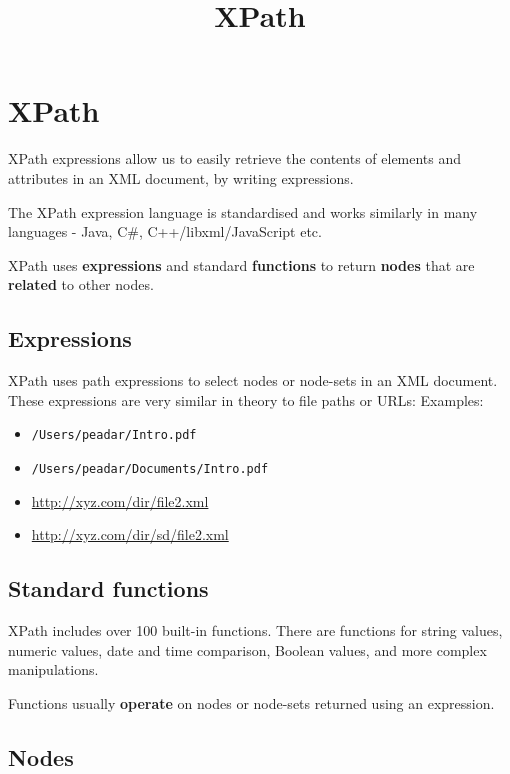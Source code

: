\documentclass{pgnotes}
\title{XPath}
\begin{document}
\maketitle

\section{XPath}

XPath expressions allow us to easily retrieve the contents of elements and attributes in an XML document, by writing expressions.  

The XPath expression language is standardised and works similarly in many languages - Java, C\#, C++/libxml/JavaScript etc.

XPath uses \textbf{expressions} and standard \textbf{functions} to return \textbf{nodes} that are \textbf{related} to other nodes. 


\subsection{Expressions}

XPath uses path expressions to select nodes or node-sets in an XML document.
These expressions are very similar in theory to file paths or URLs:
Examples:
\begin{itemize}
\item \texttt{/Users/peadar/Intro.pdf}
\item \texttt{/Users/peadar/Documents/Intro.pdf}
\item \url{http://xyz.com/dir/file2.xml}
\item \url{http://xyz.com/dir/sd/file2.xml}
\end{itemize}


\subsection{Standard functions}

XPath includes over 100 built-in functions.
There are functions for string values, numeric values, date and time comparison, Boolean values, and more complex manipulations.
  
Functions usually \textbf{operate} on nodes or node-sets returned using an expression. 


\subsection{Nodes}
\end{document}
